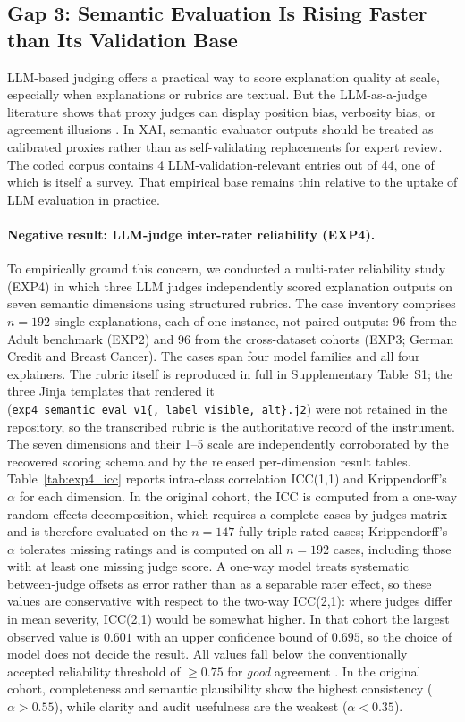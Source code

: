 \documentclass[10pt]{article}
\begin{document}
\subsection{Gap 3: Semantic Evaluation Is Rising Faster than Its Validation Base}

LLM-based judging offers a practical way to score explanation quality at
scale, especially when explanations or rubrics are textual. But the
LLM-as-a-judge literature shows that proxy judges can display position
bias, verbosity bias, or agreement illusions
\citep{zheng2023judging,gu2024llmjudge}. In XAI, semantic evaluator
outputs should be treated as calibrated proxies rather than as
self-validating replacements for expert review. The coded corpus contains
4 LLM-validation-relevant entries out of 44, one of which is itself a survey.
That empirical base remains thin relative to the uptake of LLM evaluation
in practice.

\paragraph{Negative result: LLM-judge inter-rater reliability (EXP4).}
To empirically ground this concern, we conducted a multi-rater reliability
study (EXP4) in which three LLM judges independently scored explanation
outputs on seven semantic dimensions using structured rubrics. The case
inventory comprises $n=192$ single explanations, each of one instance, not
paired outputs: 96 from the Adult benchmark (EXP2) and 96 from the
cross-dataset cohorts (EXP3; German Credit and Breast Cancer). The cases span
four model families and all four explainers.
The rubric itself is reproduced in full in Supplementary Table~S1; the three
Jinja templates that rendered it
(\texttt{exp4\_semantic\_eval\_v1\{,\_label\_visible,\_alt\}.j2}) were not
retained in the repository, so the transcribed rubric is the authoritative
record of the instrument. The seven dimensions and their 1--5 scale are
independently corroborated by the recovered scoring schema and by the released
per-dimension result tables.
Table~\ref{tab:exp4_icc} reports intra-class correlation ICC(1,1) and
Krippendorff's $\alpha$ for each dimension. In the original cohort, the ICC is
computed from a one-way random-effects decomposition, which requires a complete
cases-by-judges matrix and is therefore evaluated on the $n=147$
fully-triple-rated cases; Krippendorff's $\alpha$ tolerates missing ratings
and is computed on all $n=192$ cases, including those with at least one
missing judge score. A one-way model treats systematic
between-judge offsets as error rather than as a separable rater effect, so
these values are conservative with respect to the two-way ICC(2,1): where
judges differ in mean severity, ICC(2,1) would be somewhat higher. In that
cohort the largest observed value is $0.601$ with an upper confidence bound
of $0.695$, so the choice of model does not decide the result. All values fall below the
conventionally accepted reliability threshold of $\geq 0.75$ for
\emph{good} agreement \citep{koo2016guideline}.
In the original cohort, completeness and semantic plausibility show the
highest consistency ($\alpha > 0.55$), while clarity and audit usefulness are
the weakest ($\alpha < 0.35$).
\end{document}
